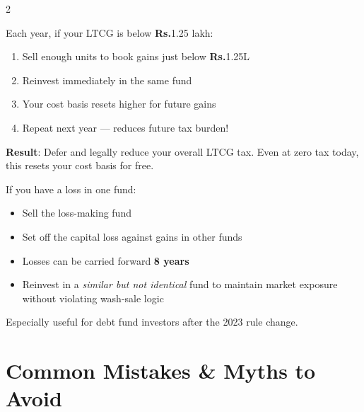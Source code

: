 \documentclass[11pt,a4paper]{article}
\newcommand{\rupee}{\textbf{\textsf{Rs.}}}
\begin{document}
\vspace{5pt}

\begin{multicols}{2}
\begin{tipbox}[title=Tax Harvesting (Equity)]
Each year, if your LTCG is below \rupee{}1.25 lakh:
\begin{enumerate}
  \item Sell enough units to book gains just below \rupee{}1.25L
  \item Reinvest immediately in the same fund
  \item Your cost basis resets higher for future gains
  \item Repeat next year --- reduces future tax burden!
\end{enumerate}
\textbf{Result}: Defer and legally reduce your overall LTCG tax.  Even at zero tax today, this resets your cost basis for free.
\end{tipbox}

\columnbreak

\begin{tipbox}[title=Tax Loss Harvesting]
If you have a loss in one fund:
\begin{itemize}
  \item Sell the loss-making fund
  \item Set off the capital loss against gains in other funds
  \item Losses can be carried forward \textbf{8 years}
  \item Reinvest in a \emph{similar but not identical} fund to maintain market exposure without violating wash-sale logic
\end{itemize}
Especially useful for debt fund investors after the 2023 rule change.
\end{tipbox}
\end{multicols}

\section{Common Mistakes \& Myths to Avoid}
\end{document}

